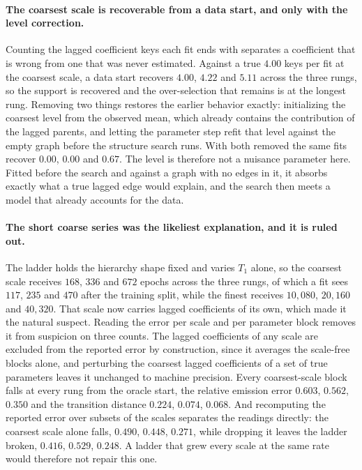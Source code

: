 \paragraph{The coarsest scale is recoverable from a data start, and only with
the level correction.}
Counting the lagged coefficient keys each fit ends with separates a coefficient
that is wrong from one that was never estimated. Against a true $4.00$ keys per
fit at the coarsest scale, a data start recovers $4.00$, $4.22$ and $5.11$
across the three rungs, so the support is recovered and the over-selection that
remains is at the longest rung. Removing two things restores the earlier behavior
exactly: initializing the coarsest level from the observed mean, which already
contains the contribution of the lagged parents, and letting the parameter step
refit that level against the empty graph before the structure search runs. With
both removed the same fits recover $0.00$, $0.00$ and $0.67$. The level is
therefore not a nuisance parameter here. Fitted before the search and against a
graph with no edges in it, it absorbs exactly what a true lagged edge would
explain, and the search then meets a model that already accounts for the data.

\paragraph{The short coarse series was the likeliest explanation, and it is
ruled out.}
The ladder holds the hierarchy shape fixed and varies $T_1$ alone, so the
coarsest scale receives $168$, $336$ and $672$ epochs across the three rungs, of
which a fit sees $117$, $235$ and $470$ after the training split, while the
finest receives $10{,}080$, $20{,}160$ and $40{,}320$. That scale now carries lagged
coefficients of its own, which made it the natural suspect. Reading the error
per scale and per parameter block removes it from suspicion on three counts.
The lagged coefficients of any scale are excluded from the reported error by
construction, since it averages the scale-free blocks alone, and perturbing the
coarsest lagged coefficients of a set of true parameters leaves it unchanged to
machine precision. Every coarsest-scale block falls at every rung from the
oracle start, the relative emission error $0.603$, $0.562$, $0.350$ and the
transition distance $0.224$, $0.074$, $0.068$. And recomputing the reported
error over subsets of the scales separates the readings directly: the coarsest
scale alone falls, $0.490$, $0.448$, $0.271$, while dropping it leaves the
ladder broken, $0.416$, $0.529$, $0.248$. A ladder that grew every scale at the
same rate would therefore not repair this one.

